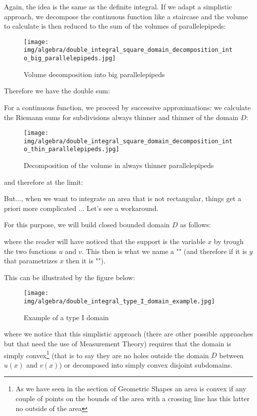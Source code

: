 	Again, the idea is the same as the definite integral. If we adapt a simplistic approach, we decompose the continuous function like a staircase and the volume to calculate is then reduced to the sum of the volumes of parallelepipeds:
		
	\begin{figure}[H]
		\centering
		\texttt{[image: img/algebra/double\_integral\_square\_domain\_decomposition\_into\_big\_parallelepipeds.jpg]}
		\caption{Volume decomposition into big parallelepipeds}
	\end{figure}
	Therefore we have the double sum:
	
	For a continuous function, we proceed by successive approximations: we calculate the Riemann sums for subdivisions always thinner and thinner of the domain $D$:
	\begin{figure}[H]
		\centering
		\texttt{[image: img/algebra/double\_integral\_square\_domain\_decomposition\_into\_thin\_parallelepipeds.jpg]}
		\caption{Decomposition of the volume in always thinner parallelepipeds}
	\end{figure}
	and therefore at the limit:
	
	But..., when we want to integrate an area that is not rectangular, things get a priori more complicated ... Let's see a workaround.
	
	For this purpose, we will build closed bounded domain $D$ as follows:
	
	where the reader will have noticed that the support is the variable $x$ by trough the two functions $u$ and $v$. This then is what we name a "" (and therefore if it is $y$ that parametrizes $x$ then it is "").

	This can be illustrated by the figure below:
	\begin{figure}[H]
		\centering
		\texttt{[image: img/algebra/double\_integral\_type\_I\_domain\_example.jpg]}
		\caption{Example of a type I domain}
	\end{figure}
	where we notice that this simplistic approach (there are other possible approaches but that need the use of Measurement Theory) requires that the domain is simply convex\footnote{As we have seen in the section of Geometric Shapes an area is convex if any couple of points on the bounds of the area with a crossing line has this latter no outside of the area} (that is to say they are no holes outside the domain $D$ between $u (x)$ and $v (x)$) or decomposed into simply convex disjoint subdomains.

